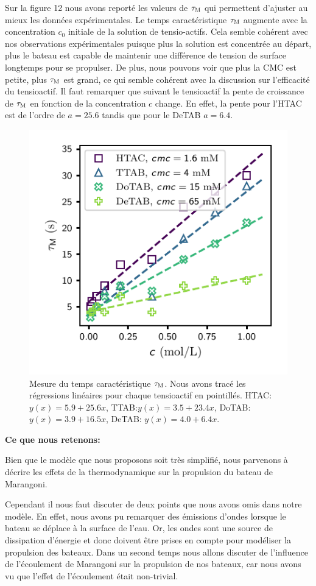 \documentclass[french, 10pt]{article}
\begin{document}
Sur la figure 12 nous avons reporté les valeurs de $\tau_{\rm M}$ qui permettent d'ajuster au mieux les données expérimentales. Le temps caractéristique $\tau_{\rm M}$ augmente avec la concentration $c_0$ initiale de la solution de tensio-actifs. Cela semble cohérent avec nos observations expérimentales puisque plus la solution est concentrée au départ, plus le bateau est capable de maintenir une différence de tension de surface longtemps pour se propulser. De plus, nous pouvons voir que plus la CMC est petite, plus $\tau_{\rm M}$ est grand, ce qui semble cohérent avec la discussion sur l'efficacité du tensioactif. Il faut remarquer que suivant le tensioactif la pente de croissance de $\tau_{\rm M}$ en fonction de la concentration $c$ change. En effet, la pente pour l'HTAC est de l'ordre de $a= 25.6$ tandis que pour le DeTAB $a=6.4$.

  \begin{figure}[!ht]
    \centering
    \includegraphics{Temps_caracteristique_versus_concentration.pdf}
    \caption{Mesure du temps caractéristique $\tau_{\rm M}$. Nous avons tracé les régressions linéaires pour chaque tensioactif en pointillés. HTAC: $y(x) = 5.9 + 25.6x$, TTAB:$y(x) = 3.5 + 23.4x$, DoTAB: $y(x) = 3.9 + 16.5x$, DeTAB: $y(x) = 4.0 + 6.4x$. }
    \label{fig:taum}
  \end{figure}
  \noindent \textbf{Ce que nous retenons:}\bigskip

  Bien que le modèle que nous proposons soit très simplifié, nous parvenons à décrire les effets de la thermodynamique sur la propulsion du bateau de Marangoni.\bigskip

  Cependant il nous faut discuter de deux points que nous avons omis dans notre modèle. En effet, nous avons pu remarquer des émissions d'ondes lorsque le bateau se déplace à la surface de l'eau. Or, les ondes sont une source de dissipation d'énergie et donc doivent être prises en compte pour modéliser la propulsion des bateaux. Dans un second temps nous allons discuter de l'influence de l'écoulement de Marangoni sur la propulsion de nos bateaux, car nous avons vu que l'effet de l'écoulement était non-trivial.
\end{document}
